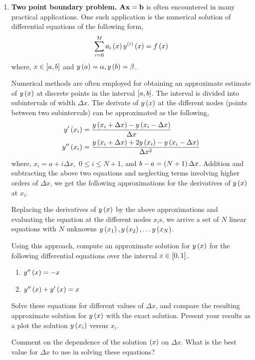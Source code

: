 \documentclass[9pt]{article}
\def\mf{\ensuremath\mathbf}
\def\lp{\ensuremath\left(}
\def\rp{\ensuremath\right)}
\def\ls{\ensuremath\left[}
\def\rs{\ensuremath\right]}
\newcommand{\ct}[1]{\lp #1\rp}
\newcommand{\dt}[1]{\ls #1\rs}
\begin{document}
\begin{multicols}{2}
\begin{enumerate}
    \item \textbf{Two point boundary problem.} $\mf{A}\mf{x} = \mf{b}$ is often encountered in many practical applications. One such application is the numerical solution of differential equations of the following form,
    \[ \sum_{i=0}^M a_{i}\ct{x}y^{\ct{i}}\ct{x} = f\ct{x} \]
    where, $x \in \dt{a, b}$ and $y\ct{a} = \alpha, y\ct{b} = \beta$. 

    Numerical methods are often employed for obtaining an approximate estimate of $y\ct{x}$ at discrete points in the interval $\dt{a,b}$. The interval is divided into subintervals of width $\Delta x$. The derivate of $y\ct{x}$ at the different nodes (points between two subintervals) can be approximated as the following,
    \begin{align}
    y'\ct{x_i} &= \frac{y\ct{x_i + \Delta x} - y\ct{x_i - \Delta x}}{\Delta x}\nonumber\\
    y''\ct{x_i} &= \frac{y\ct{x_i + \Delta x} + 2y\ct{x_i} - y\ct{x_i - \Delta x}}{\Delta x^2} \nonumber
    \end{align}
    where, $x_i = a + i\Delta x, \,\, 0 \leq i \leq N+1$, and $b - a = \ct{N+1} \Delta x$. Addition and subtracting the above two equations and neglecting terms involving higher orders of $\Delta x$, we get the following approximations for the derivatives of $y\ct{x}$ at $x_i$.

    Replacing the derivatives of $y\ct{x}$ by the above approximations and evaluating the equation at the different nodes $x_i$s, we arrive a set of $N$ linear equations with $N$ unknowns $y\ct{x_1}, y\ct{x_2}, \ldots y\ct{x_N}$. 

    Using this approach, compute an approximate solution for $y\ct{x}$ for the following differential equations over the interval $x \in \dt{0, 1}$. 
    \begin{enumerate}
         \item $y''\ct{x} = -x$
         \item $y''\ct{x} + y'\ct{x} = x$
    \end{enumerate}
    Solve these equations for different values of $\Delta x$, and compare the resulting approximate solution for $y\ct{x}$ with the exact solution.   Present your results as a plot the solution $y\ct{x_i}$ versus $x_i$.

    Comment on the dependence of the solution $\ct{x}$ on $\Delta x$. What is the best value for $\Delta x$ to use in solving these equations?


\end{enumerate}
\end{multicols}
\end{document}
